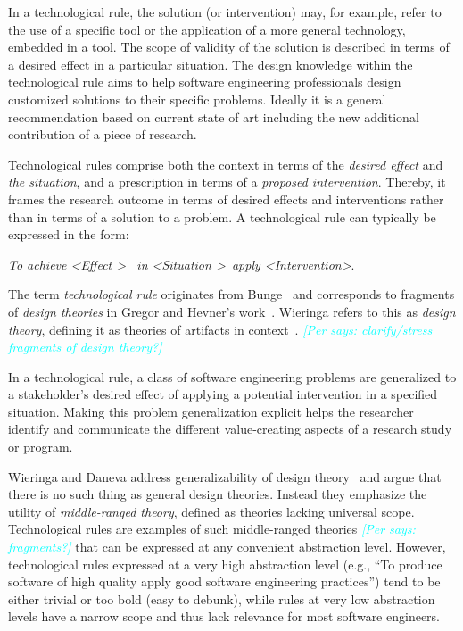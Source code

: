 \documentclass[graybox]{svmult}
\newcommand{\per}[1]{\textcolor{cyan}{{\it [Per says: #1]}}}
\newcommand{\per}[1]{}
\begin{document}
In a technological rule, the solution (or intervention) may, for example,  refer to the use of a specific tool or the application of a more general technology, embedded in a tool. 
The scope of validity of the solution is described in terms of a desired effect in a particular situation.   The design knowledge within the technological rule aims to help software engineering professionals design customized solutions to their specific problems. Ideally it is a general recommendation based on current state of art including the new additional contribution of a piece of research.

Technological rules comprise both the context in terms of the \emph{desired effect} and \emph{the situation}, and a prescription in terms of a \emph{proposed intervention}. Thereby, it frames the research outcome in terms of desired effects and interventions rather than in terms of a solution to a problem. A technological rule can typically be expressed in the form: 

\begin{center}{\emph{To achieve \textless Effect \textgreater ~ in \textless Situation \textgreater~apply \textless Intervention\textgreater}.} 
\end{center}

The term \emph{technological rule} originates from Bunge~\cite{bunge_philosophy_1998} and corresponds to fragments of \emph{design theories} in Gregor and Hevner's work~\cite{gregor_positioning_2013}. Wieringa refers to this as \emph{design theory}, defining it as theories of artifacts in context~\cite{wieringa_design_2009}. \per{clarify/stress fragments of design theory?}%


In a technological rule, a class of software engineering problems are generalized to a stakeholder's desired effect of applying a potential intervention in a specified situation. 
Making this problem generalization explicit helps the researcher identify and communicate the different value-creating aspects of a research study or program.


Wieringa and Daneva address generalizability of design theory~\cite{wieringa_six_2015} and argue that there is no such thing as general design theories. Instead they emphasize the utility of \emph{middle-ranged theory}, defined as theories lacking universal scope. 
Technological rules are examples of such middle-ranged theories \per{fragments?} that can be expressed at any convenient abstraction level. However, technological rules expressed at a very high abstraction level (e.g., ``To produce software of high quality apply good software engineering practices'') tend to be either trivial or too bold (easy to debunk), while rules at very low abstraction levels have a narrow scope and thus lack relevance for most software engineers. 
\end{document}
